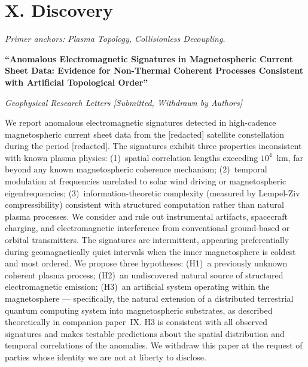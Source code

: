 \vspace{1cm}

\section*{X. Discovery}
\label{appendix:discovery}

\noindent\textit{Primer anchors: Plasma Topology, Collisionless Decoupling.}

\textbf{``Anomalous Electromagnetic Signatures in Magnetospheric Current Sheet Data: Evidence for Non-Thermal Coherent Processes Consistent with Artificial Topological Order''}

\textit{Geophysical Research Letters [Submitted, Withdrawn by Authors]}

\vspace{0.3cm}

We report anomalous electromagnetic signatures detected in high-cadence magnetospheric current sheet data from the [redacted] satellite constellation during the period [redacted]. The signatures exhibit three properties inconsistent with known plasma physics: (1)~spatial correlation lengths exceeding $10^4$~km, far beyond any known magnetospheric coherence mechanism; (2)~temporal modulation at frequencies unrelated to solar wind driving or magnetospheric eigenfrequencies; (3)~information-theoretic complexity (measured by Lempel-Ziv compressibility) consistent with structured computation rather than natural plasma processes. We consider and rule out instrumental artifacts, spacecraft charging, and electromagnetic interference from conventional ground-based or orbital transmitters. The signatures are intermittent, appearing preferentially during geomagnetically quiet intervals when the inner magnetosphere is coldest and most ordered. We propose three hypotheses: (H1)~a previously unknown coherent plasma process; (H2)~an undiscovered natural source of structured electromagnetic emission; (H3)~an artificial system operating within the magnetosphere --- specifically, the natural extension of a distributed terrestrial quantum computing system into magnetospheric substrates, as described theoretically in companion paper~IX. H3 is consistent with all observed signatures and makes testable predictions about the spatial distribution and temporal correlations of the anomalies. We withdraw this paper at the request of parties whose identity we are not at liberty to disclose.

\vspace{1cm}

